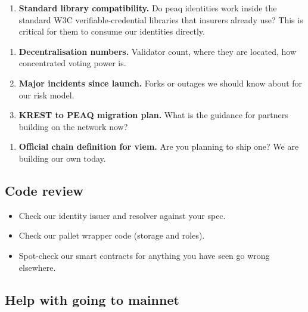 \documentclass[11pt,a4paper]{article}
\begin{document}
\begin{infobox}[title=Identity standards]
\begin{enumerate}[leftmargin=*, nosep, start=3]
  \item \textbf{Standard library compatibility.} Do peaq identities work inside the standard W3C verifiable-credential libraries that insurers already use? This is critical for them to consume our identities directly.
\end{enumerate}
\end{infobox}

\begin{infobox}[title=Network safety]
\begin{enumerate}[leftmargin=*, nosep, start=4]
  \item \textbf{Decentralisation numbers.} Validator count, where they are located, how concentrated voting power is.
  \item \textbf{Major incidents since launch.} Forks or outages we should know about for our risk model.
  \item \textbf{KREST to PEAQ migration plan.} What is the guidance for partners building on the network now?
\end{enumerate}
\end{infobox}

\begin{infobox}[title=Tooling]
\begin{enumerate}[leftmargin=*, nosep, start=7]
  \item \textbf{Official chain definition for viem.} Are you planning to ship one? We are building our own today.
\end{enumerate}
\end{infobox}

\subsection{Code review}

\begin{itemize}[leftmargin=*]
  \item Check our identity issuer and resolver against your spec.
  \item Check our pallet wrapper code (storage and roles).
  \item Spot-check our smart contracts for anything you have seen go wrong elsewhere.
\end{itemize}

\subsection{Help with going to mainnet}
\end{document}
